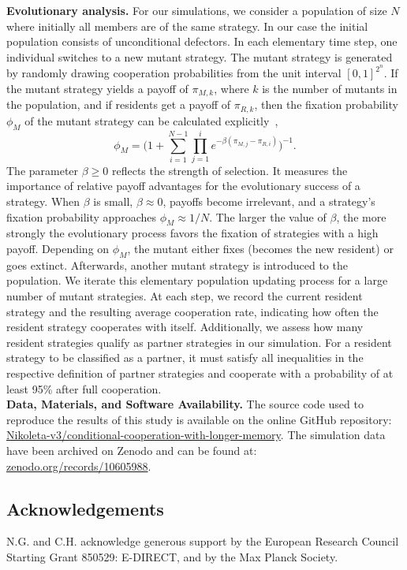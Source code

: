 \documentclass[9pt,twocolumn,twoside]{pnas-new}
\begin{document}
\noindent
{\bf Evolutionary analysis.} For our simulations, we consider a population of size \(N\) where initially all
members are of the same strategy. 
In our case the initial population consists of unconditional defectors. 
In each elementary time step, one individual switches to a new mutant strategy. 
The mutant strategy is generated by randomly drawing cooperation probabilities from the unit interval \([0,1]^{2^n}\). 
If the mutant strategy yields a payoff of \(\pi_{M, k}\), where \(k\) is the number of
mutants in the population, and if residents get a payoff of \(\pi_{R,
k}\), then the fixation probability \(\phi_{M}\) of the mutant strategy can be
calculated explicitly~\citep{nowak:Nature:2004},
\begin{equation}\label{eq:fixation_probability}
  \phi_{M} =\Big(1 + \displaystyle \sum_{i=1}^{N - 1} \prod_{j=1}^{i} e^{- \beta (\pi_{M, j} - \pi_{R, i})} \Big)^{-1}.
\end{equation}
The parameter \(\beta \geq 0\) reflects the strength of selection. 
It measures the importance of relative payoff advantages for the evolutionary success of a strategy. 
When \(\beta\) is small, \(\beta \approx 0\), payoffs become irrelevant, and a strategy's fixation probability approaches
\(\phi_{M} \approx 1 / N\). 
The larger the value of \(\beta\), the more strongly the evolutionary process favors the fixation of strategies with a high
payoff.
Depending on \(\phi_{M}\), the mutant either fixes (becomes the new resident) or goes extinct. 
Afterwards, another mutant strategy is introduced to the population. 
We iterate this elementary population updating process for a large number of
mutant strategies. At each step, we record the current resident
strategy and the resulting average cooperation rate, indicating how often the
resident strategy cooperates with itself. Additionally, we assess how many
resident strategies qualify as partner strategies in our simulation. For a
resident strategy to be classified as a partner, it must satisfy all
inequalities in the respective definition of partner strategies and cooperate
with a probability of at least 95\% after full cooperation.\\

\noindent
{\bf Data, Materials, and Software Availability.} The source code used to
reproduce the results of this study is available on the online GitHub
repository:
\href{https://github.com/Nikoleta-v3/conditional-cooperation-with-longer-memory}{Nikoleta-v3/conditional-cooperation-with-longer-memory}.
The simulation data have been archived on Zenodo and can be found at:
\href{https://zenodo.org/records/10605988}{zenodo.org/records/10605988}.

\subsection*{Acknowledgements}

N.G. and C.H. acknowledge generous support by the European Research Council
Starting Grant 850529: E-DIRECT, and by the Max Planck Society.


{\setlength{\bibsep}{0\baselineskip}


}


\clearpage
\newpage
\end{document}
